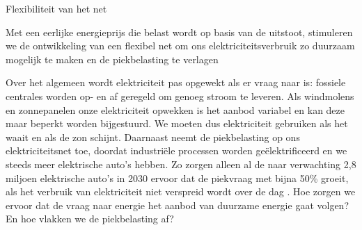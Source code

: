 \begin{voorstel}{Flexibiliteit van het net}


\begin{samenvatting}
Met een eerlijke energieprijs die belast wordt op basis van de uitstoot, stimuleren we de ontwikkeling van een flexibel net om ons elektriciteitsverbruik zo duurzaam mogelijk te maken en de piekbelasting te verlagen
\end{samenvatting}

\begin{multicols*}{2}
\raggedcolumns

\begin{uitdaging}
Over het algemeen wordt elektriciteit pas opgewekt als er vraag naar is: fossiele centrales worden op- en af geregeld om genoeg stroom te leveren. Als windmolens en zonnepanelen onze elektriciteit opwekken is het aanbod variabel en kan deze maar beperkt worden bijgestuurd. We moeten dus elektriciteit gebruiken als het waait en als de zon schijnt. Daarnaast neemt de piekbelasting op ons elektriciteitsnet toe, doordat industriële processen worden geëlektrificeerd en we steeds meer elektrische auto’s hebben. Zo zorgen alleen al de naar verwachting 2,8 miljoen elektrische auto’s in 2030 ervoor dat de piekvraag met bijna 50\% groeit, als het verbruik van elektriciteit niet verspreid wordt over de dag \parencite{enpuls_slim_2019}. Hoe zorgen we ervoor dat de vraag naar energie het aanbod van duurzame energie gaat volgen? En hoe vlakken we de piekbelasting af?
\end{uitdaging}

\begin{overwegingen}


\end{overwegingen}
\end{multicols*}
\end{voorstel}
